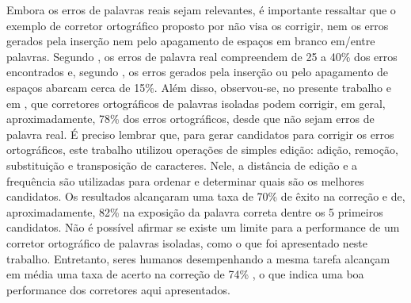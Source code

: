 \documentclass{textolivre}
\begin{document}
Embora os erros de palavras reais sejam
relevantes, é importante ressaltar que o exemplo de corretor ortográfico proposto por \textcite{norvig2007} não visa os
corrigir, nem os erros gerados pela
inserção nem pelo apagamento de espaços
em branco em/entre palavras.
Segundo \textcite{verberne2002}, os erros de palavra real
compreendem de 25 a 40\% dos erros encontrados \cite{wing1980,mitton1987,young1991} e, 
segundo \textcite{kukich1992b}, os erros
gerados pela inserção ou pelo apagamento
de espaços abarcam cerca de 15\%.
Além disso, observou-se, no presente
trabalho e em \textcite{kukich1992},
que corretores ortográficos
de palavras isoladas podem corrigir, em geral, aproximadamente, 78\% dos erros ortográficos,
desde que não sejam erros de palavra real.
É preciso lembrar que, para gerar candidatos para corrigir os erros ortográficos, este trabalho utilizou 
operações de simples edição:
adição, remoção, substituição e transposição de caracteres. Nele, a
distância de edição e a frequência 
são utilizadas para ordenar e determinar quais são os melhores candidatos.
Os resultados alcançaram uma taxa de
70\% de êxito na correção e de,
aproximadamente, 82\%
na exposição da palavra correta
dentre os 5 primeiros candidatos.
Não é possível afirmar se existe um limite para a performance de um corretor ortográfico de palavras isoladas,
como o que foi apresentado neste trabalho. Entretanto, seres humanos desempenhando a mesma tarefa
alcançam em média uma taxa de acerto na correção de 74\% \cite{kukich1992}, o
que indica uma boa performance dos 
corretores aqui apresentados. 



\end{document}
